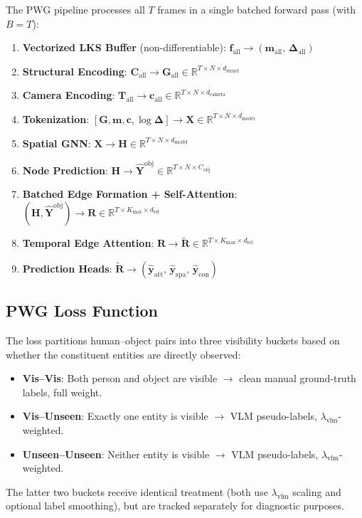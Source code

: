 \documentclass[runningheads]{llncs}
\newcommand{\mR}{\mathbb{R}}
\newcommand{\mat}[1]{\bm{#1}}
\begin{document}
The PWG pipeline processes all $T$ frames in a single batched forward pass (with $B=T$):
\begin{enumerate}
    \item \textbf{Vectorized LKS Buffer} (non-differentiable): $\mat{f}_{\text{all}} \to (\mat{m}_{\text{all}},\,\bm{\Delta}_{\text{all}})$
    \item \textbf{Structural Encoding}: $\mat{C}_{\text{all}} \to \mat{G}_{\text{all}} \in \mR^{T \times N \times d_{\text{struct}}}$
    \item \textbf{Camera Encoding}: $\mat{T}_{\text{all}} \to \mat{c}_{\text{all}} \in \mR^{T \times N \times d_{\text{camera}}}$
    \item \textbf{Tokenization}: $[\mat{G}, \mat{m}, \mat{c}, \log \bm{\Delta}] \to \mat{X} \in \mR^{T \times N \times d_{\text{model}}}$
    \item \textbf{Spatial GNN}: $\mat{X} \to \mat{H} \in \mR^{T \times N \times d_{\text{model}}}$
    \item \textbf{Node Prediction}: $\mat{H} \to \hat{\mat{Y}}^{\text{obj}} \in \mR^{T \times N \times C_{\text{obj}}}$
    \item \textbf{Batched Edge Formation + Self-Attention}: $(\mat{H}, \hat{\mat{Y}}^{\text{obj}}) \to \mat{R} \in \mR^{T \times K_{\max} \times d_{\text{rel}}}$
    \item \textbf{Temporal Edge Attention}: $\mat{R} \to \tilde{\mat{R}} \in \mR^{T \times K_{\max} \times d_{\text{rel}}}$
    \item \textbf{Prediction Heads}: $\tilde{\mat{R}} \to (\hat{\mat{y}}_{\text{att}},\,\hat{\mat{y}}_{\text{spa}},\,\hat{\mat{y}}_{\text{con}})$
\end{enumerate}

\subsection{PWG Loss Function}
\label{sec:pwg_loss}

The loss partitions human--object pairs into three visibility buckets based on whether the constituent entities are directly observed:
\begin{itemize}
    \item \textbf{Vis--Vis}: Both person and object are visible $\to$ clean manual ground-truth labels, full weight.
    \item \textbf{Vis--Unseen}: Exactly one entity is visible $\to$ VLM pseudo-labels, $\lambda_{\text{vlm}}$-weighted.
    \item \textbf{Unseen--Unseen}: Neither entity is visible $\to$ VLM pseudo-labels, $\lambda_{\text{vlm}}$-weighted.
\end{itemize}
The latter two buckets receive identical treatment (both use $\lambda_{\text{vlm}}$ scaling and optional label smoothing), but are tracked separately for diagnostic purposes.
\end{document}
